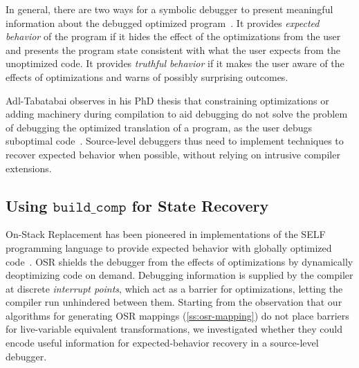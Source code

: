 In general, there are two ways for a symbolic debugger to present meaningful information about the debugged optimized program~\cite{Wu99}. It provides {\em expected behavior} of the program if it hides the effect of the optimizations from the user and presents the program state consistent with what the user expects from the unoptimized code. It provides {\em truthful behavior} if it makes the user aware of the effects of optimizations and warns of possibly surprising outcomes.

Adl-Tabatabai observes in his PhD thesis that constraining optimizations or adding machinery during compilation to aid debugging do not solve the problem of debugging the optimized translation of a program, as the user debugs suboptimal code~\cite{Adl-Tabatabai96thesis}. Source-level debuggers thus need to implement techniques to recover expected behavior when possible, without relying on intrusive compiler extensions.

\subsection{Using \texorpdfstring{$\texttt{build\_comp}$}{build\_comp} for State Recovery}
On-Stack Replacement has been pioneered in implementations of the SELF programming language to provide expected behavior with globally optimized code~\cite{Holzle92}. OSR shields the debugger from the effects of optimizations by dynamically deoptimizing code on demand. Debugging information is supplied by the compiler at discrete {\em interrupt points}, which act as a barrier for optimizations, letting the compiler run unhindered between them. Starting from the observation that our algorithms for generating OSR mappings (\mysection\ref{ss:osr-mapping}) do not place barriers for live-variable equivalent transformations, we investigated whether they could encode useful information for expected-behavior recovery in a source-level debugger.

